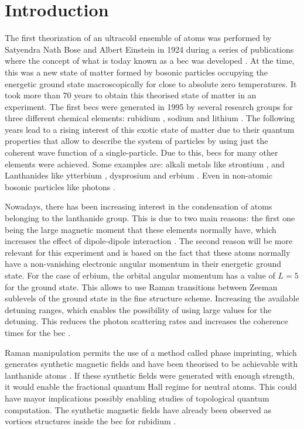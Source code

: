 
\chapter{Introduction}
\label{chap:intro}

The first theorization of an ultracold ensemble of atoms was performed by Satyendra Nath Bose and Albert Einstein in 1924 during a series of publications where the concept of what is today known as a \acf{bec} was developed \cite{Bose1924, Einstein1924, Einstein1925}. At the time, this was a new state of matter formed by bosonic particles occupying the energetic ground state macroscopically for close to absolute zero temperatures. It took more than 70 years to obtain this theorised state of matter in an experiment. The first \acp{bec} were generated in 1995 by several research groups for three different chemical elements: rubidium \cite{Davis1995}, sodium \cite{Anderson1995} and lithium \cite{Bradley1995}. The following years lead to a rising interest of this exotic state of matter due to their quantum properties that allow to describe the system of particles by using just the coherent wave function of a single-particle. Due to this, \acp{bec} for many other elements were achieved. Some examples are: alkali metals like strontium \cite{Stellmer2009}, and Lanthanides like ytterbium \cite{Takasu2003}, dysprosium \cite{Lu2011} and erbium \cite{Aikawa2012}. Even in non-atomic bosonic particles like photons \cite{Klaers2010}.

Nowadays, there has been increasing interest in the condensation of atoms belonging to the lanthanide group. This is due to two main reasons: the first one being the large magnetic moment that these elements normally have, which increases the effect of dipole-dipole interaction \cite{Aikawa2012,Baier2018}. The second reason will be more relevant for this experiment and is based on the fact that these atoms normally have a non-vanishing electronic angular momentum in their energetic ground state. For the case of erbium, the orbital angular momentum has a value of $L=5$ for the ground state. This allows to use Raman transitions between Zeeman sublevels of the ground state in the fine structure scheme. Increasing the available detuning ranges, which enables the possibility of using large values for the detuning. This reduces the photon scattering rates and increases the coherence times for the \ac{bec} \cite{Grimm2000}.

Raman manipulation permits the use of a method called phase imprinting, which generates synthetic magnetic fields and have been theorised to be achievable with lanthanide atoms \cite{cui2013synthetic}. If these synthetic fields were generated with enough strength, it would enable the fractional quantum Hall regime for neutral atoms. This could have mayor implications possibly enabling studies of topological quantum computation. The synthetic magnetic fields have already been observed as vortices structures inside the \ac{bec} for rubidium \cite{Lin2009}.

